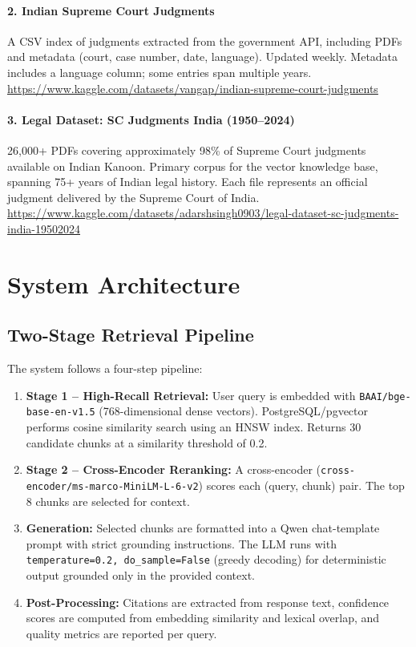\documentclass[11pt,a4paper]{article}
\begin{document}
\paragraph{2. Indian Supreme Court Judgments}
A CSV index of judgments extracted from the government API, including
PDFs and metadata (court, case number, date, language). Updated weekly.
Metadata includes a language column; some entries span multiple years.\\
\url{https://www.kaggle.com/datasets/vangap/indian-supreme-court-judgments}

\paragraph{3. Legal Dataset: SC Judgments India (1950--2024)}
26,000+ PDFs covering approximately 98\% of Supreme Court judgments
available on Indian Kanoon. Primary corpus for the vector knowledge
base, spanning 75+ years of Indian legal history. Each file represents
an official judgment delivered by the Supreme Court of India.\\
\url{https://www.kaggle.com/datasets/adarshsingh0903/legal-dataset-sc-judgments-india-19502024}

\section{System Architecture}

\subsection{Two-Stage Retrieval Pipeline}

The system follows a four-step pipeline:

\begin{enumerate}[noitemsep]
    \item \textbf{Stage 1 -- High-Recall Retrieval:} User query is embedded
        with \texttt{BAAI/bge-base-en-v1.5} (768-dimensional dense vectors).
        PostgreSQL/pgvector performs cosine similarity search using an HNSW
        index. Returns 30 candidate chunks at a similarity threshold of 0.2.
    \item \textbf{Stage 2 -- Cross-Encoder Reranking:} A cross-encoder
        (\texttt{cross-encoder/ms-marco-MiniLM-L-6-v2}) scores each
        (query, chunk) pair. The top 8 chunks are selected for context.
    \item \textbf{Generation:} Selected chunks are formatted into a Qwen
        chat-template prompt with strict grounding instructions. The LLM
        runs with \texttt{temperature=0.2, do\_sample=False} (greedy
        decoding) for deterministic output grounded only in the provided
        context.
    \item \textbf{Post-Processing:} Citations are extracted from response
        text, confidence scores are computed from embedding similarity and
        lexical overlap, and quality metrics are reported per query.
\end{enumerate}
\end{document}

